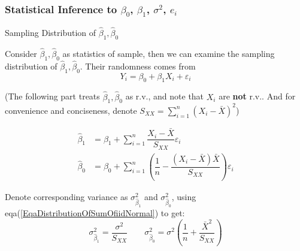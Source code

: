 




\subsubsection{Statistical Inference to $ \beta _0 $, $ \beta _1 $, $ \sigma ^2 $, $ e_i $}

\begin{point}
    Sampling Distribution of $ \hat{\beta} _1,\hat{\beta} _0  $
\end{point}

    Consider $ \hat{\beta} _1,\hat{\beta} _0 $ as statistics of sample, then we can examine the sampling distribution of $  \hat{\beta} _1,\hat{\beta} _0 $. Their randomness comes from
    \begin{equation}
        Y_i=\beta_0+\beta_1X_i+\varepsilon _i 
    \end{equation}
    
    

    (The following part treats $\hat{\beta} _1,\hat{\beta} _0 $ as r.v., and note that $ X_i $ are \textbf{not }r.v.. And  for convenience and conciseness, denote $ S_{XX}={\displaystyle\sum_{i=1}^n(X_i-\bar{X})^2} $)

   
\begin{align*}
        \hat{\beta }_1&=\beta _1+\sum_{i=1}^n\dfrac{X_i-\bar{X}}{S_{XX}}\varepsilon _i\\
        \hat{\beta }_0&=\beta _0+\sum_{i=1}^n\left(\dfrac{1}{n}-\dfrac{(X_i-\bar{X})\bar{X}}{S_{XX}}\right)\varepsilon _i
\end{align*}
 
    Denote corresponding variance as $ \sigma^2_{\hat{\beta}_1} $ and $ \sigma^2_{\hat{\beta}_0} $, using eqa(\ref{EqaDistributionOfSumOfiidNormal}) to get:
    \begin{equation}
        \sigma^2_{\hat{\beta}_1}= \dfrac{\sigma^2}{S_{XX}}\qquad \sigma^2_{\hat{\beta}_0}=\sigma^2(\dfrac{1}{n}+\dfrac{\bar{X}^2}{S_{XX}})
    \end{equation} 
    
